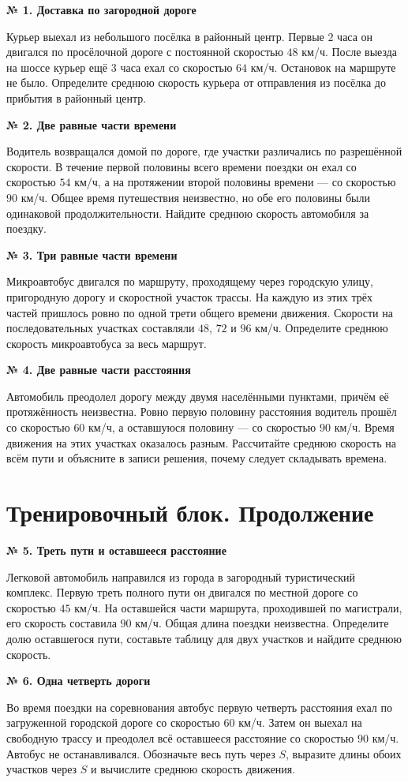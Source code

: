 \documentclass[a4paper,12pt]{article}
\newcommand{\task}[2]{\par\smallskip\noindent\textbf{№ #1. #2}\par\nobreak\smallskip}
\begin{document}
\task{1}{Доставка по загородной дороге}
Курьер выехал из небольшого посёлка в районный центр. Первые $2$ часа он двигался по просёлочной дороге с постоянной скоростью $48$ км/ч. После выезда на шоссе курьер ещё $3$ часа ехал со скоростью $64$ км/ч. Остановок на маршруте не было. Определите среднюю скорость курьера от отправления из посёлка до прибытия в районный центр.

\task{2}{Две равные части времени}
Водитель возвращался домой по дороге, где участки различались по разрешённой скорости. В течение первой половины всего времени поездки он ехал со скоростью $54$ км/ч, а на протяжении второй половины времени --- со скоростью $90$ км/ч. Общее время путешествия неизвестно, но обе его половины были одинаковой продолжительности. Найдите среднюю скорость автомобиля за поездку.

\task{3}{Три равные части времени}
Микроавтобус двигался по маршруту, проходящему через городскую улицу, пригородную дорогу и скоростной участок трассы. На каждую из этих трёх частей пришлось ровно по одной трети общего времени движения. Скорости на последовательных участках составляли $48$, $72$ и $96$ км/ч. Определите среднюю скорость микроавтобуса за весь маршрут.

\task{4}{Две равные части расстояния}
Автомобиль преодолел дорогу между двумя населёнными пунктами, причём её протяжённость неизвестна. Ровно первую половину расстояния водитель прошёл со скоростью $60$ км/ч, а оставшуюся половину --- со скоростью $90$ км/ч. Время движения на этих участках оказалось разным. Рассчитайте среднюю скорость на всём пути и объясните в записи решения, почему следует складывать времена.

\clearpage
\section*{Тренировочный блок. Продолжение}
\task{5}{Треть пути и оставшееся расстояние}
Легковой автомобиль направился из города в загородный туристический комплекс. Первую треть полного пути он двигался по местной дороге со скоростью $45$ км/ч. На оставшейся части маршрута, проходившей по магистрали, его скорость составила $90$ км/ч. Общая длина поездки неизвестна. Определите долю оставшегося пути, составьте таблицу для двух участков и найдите среднюю скорость.

\task{6}{Одна четверть дороги}
Во время поездки на соревнования автобус первую четверть расстояния ехал по загруженной городской дороге со скоростью $60$ км/ч. Затем он выехал на свободную трассу и преодолел всё оставшееся расстояние со скоростью $90$ км/ч. Автобус не останавливался. Обозначьте весь путь через $S$, выразите длины обоих участков через $S$ и вычислите среднюю скорость движения.
\end{document}
